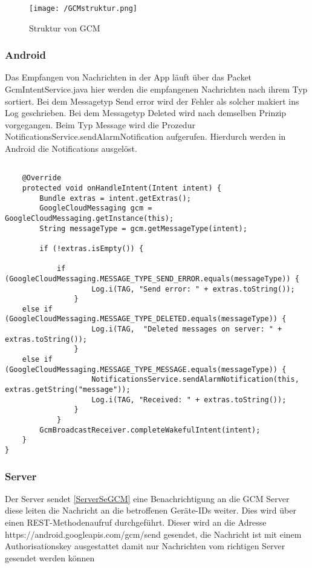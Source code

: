 \begin{figure}[H]
\centering
\texttt{[image: /GCMstruktur.png]}
\caption{Struktur von GCM}
\label{fig:GCMstrukutr}
\end{figure}

\subsubsection*{Android}
Das Empfangen von Nachrichten in der App läuft über das Packet GcmIntentService.java hier werden die empfangenen Nachrichten nach ihrem Typ sortiert. Bei dem Messagetyp Send error wird der Fehler als solcher makiert ins Log geschrieben. Bei dem Messagetyp Deleted wird nach demselben Prinzip vorgegangen. Beim Typ Message wird die Prozedur NotificationsService.sendAlarmNotification aufgerufen. Hierdurch werden in Android die Notifications ausgelöst.\\

\begin{lstlisting}[caption={Empfangen von GCM Nachrichten unter Android},label=lst:GCMget]

    @Override
    protected void onHandleIntent(Intent intent) {
        Bundle extras = intent.getExtras();
        GoogleCloudMessaging gcm = GoogleCloudMessaging.getInstance(this);
        String messageType = gcm.getMessageType(intent);

        if (!extras.isEmpty()) {

            if (GoogleCloudMessaging.MESSAGE_TYPE_SEND_ERROR.equals(messageType)) {
            		Log.i(TAG, "Send error: " + extras.toString());
	            }
 	else if (GoogleCloudMessaging.MESSAGE_TYPE_DELETED.equals(messageType)) {
            		Log.i(TAG,  "Deleted messages on server: " + extras.toString());
            	}
	else if (GoogleCloudMessaging.MESSAGE_TYPE_MESSAGE.equals(messageType)) {
            		NotificationsService.sendAlarmNotification(this, extras.getString("message"));
                	Log.i(TAG, "Received: " + extras.toString());
            	}
        	}
        GcmBroadcastReceiver.completeWakefulIntent(intent);
	} 
}

\end{lstlisting}

\subsubsection*{Server}
Der Server sendet \ref{ServerSeGCM} eine Benachrichtigung an die GCM Server diese leiten die Nachricht an die betroffenen Geräte-IDs weiter. Dies wird über einen REST-Methodenaufruf durchgeführt. Dieser wird an die Adresse https://android.googleapis.com/gcm/send gesendet, die Nachricht ist mit einem Authorisationskey ausgestattet damit nur Nachrichten vom richtigen Server gesendet werden können 

